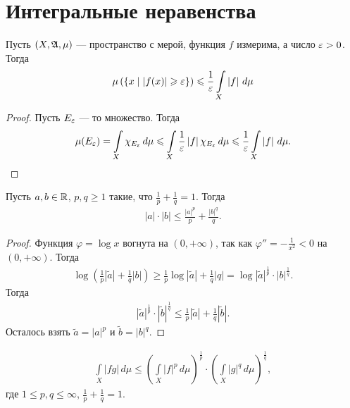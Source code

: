 \section{Интегральные неравенства}
\begin{thm}
 \label{theorem:chebishev_inequality}
 Пусть $(X, \mathfrak{A}, \mu)$ --- пространство с мерой, функция $f$ измерима, а число $\varepsilon > 0$. Тогда \begin{align*}
  \mu \left( \left\{ x \mid \left| f(x) \right| \geqslant \varepsilon \right\} \right) \leqslant \frac{1}{\varepsilon} \int\limits_{X} \left| f \right| \, d\mu  
 \end{align*} 
\end{thm}
\begin{proof}
 Пусть $E_{\varepsilon}$ --- то множество. Тогда \begin{align*}
  \mu(E_{\varepsilon}) = \int\limits_{X} \chi_{E_{\varepsilon}} \, d\mu  \leqslant \int\limits_{X} \frac{1}{\varepsilon} \left| f \right| \chi_{E_{\varepsilon}} \, d\mu  \leqslant \frac{1}{\varepsilon} \int\limits_{X} \left| f \right| \, d\mu  
 .\end{align*} 
\end{proof}
\begin{thm}
 Пусть $a, b \in \mathbb{R}$, $p,q \geqslant 1$ такие, что $\frac{1}{p} + \frac{1}{q} = 1$. Тогда \begin{align*}
  \left| a \right| \cdot \left| b \right| \leqslant \frac{\left| a \right|^{p}}{p} + \frac{\left| b \right|^{q}}{q}
 .\end{align*} 
\end{thm}
\begin{proof}
 Функция $\varphi = \log x$ вогнута на $(0, +\infty)$, так как $\varphi'' = -\frac{1}{x^{2}} < 0$ на $(0, +\infty)$. Тогда \begin{align*}
  \log \left( \frac{1}{p}\left| \tilde a \right| + \frac{1}{q} \left| b \right| \right) \geqslant \frac{1}{p}\log \left| \tilde a \right| + \frac{1}{q}\left| q \right| = \log \left| \tilde a \right|^{\frac{1}{p}} \cdot \left| b \right|^{\frac{1}{q}}
 .\end{align*} Тогда \begin{align*}
  \left| \tilde a \right|^{\frac{1}{p}} \cdot \left| \tilde b \right|^{\frac{1}{q}} \leqslant \frac{1}{p}\left| \tilde a \right| + \frac{1}{q} \left| \tilde b \right|
 .\end{align*} Осталось взять $\tilde a = \left| a \right|^{p}$ и $\tilde b = \left| b \right|^{q}$.
\end{proof}
\begin{thm}
 \begin{align*}
  \int\limits_{X} \left| fg \right| \, d\mu  \leqslant \left( \int\limits_{X} \left| f \right|^{p} \, d\mu   \right)^{\frac{1}{p}} \cdot \left( \int\limits_{X} \left| g \right|^{q} \, d\mu   \right)^{\frac{1}{q}}
 ,\end{align*}  где $1 \leqslant p, q \leqslant \infty$, $\frac{1}{p} + \frac{1}{q} = 1$.
\end{thm}
